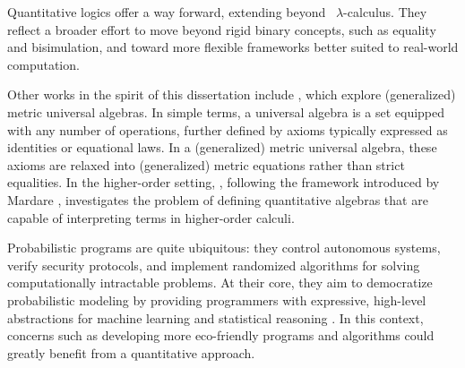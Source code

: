 Quantitative logics offer a way forward, extending beyond  $\lambda$-calculus. They reflect a broader effort to move beyond rigid binary concepts, such as equality and bisimulation, and toward more flexible frameworks better suited to real-world computation.

Other works in the spirit of this dissertation include \cite{mardare2016quantitative, mardare2017axiomatizability, mio24, jurka24}, which explore (generalized) metric universal algebras. In simple terms, a universal algebra is a set equipped with any number of operations, further defined by axioms typically expressed as identities or equational laws. In a (generalized) metric universal algebra, these axioms are relaxed into (generalized) metric equations rather than strict equalities. In the higher-order setting, \cite{lago22}, following the framework introduced by Mardare \cite{mardare2016quantitative}, investigates the problem of defining quantitative algebras that are capable of interpreting terms in higher-order calculi.


Probabilistic programs are quite ubiquitous: they control autonomous systems, verify security protocols, and implement randomized algorithms for solving computationally intractable problems. At their core, they aim to democratize probabilistic modeling by providing programmers with expressive, high-level abstractions for machine learning and statistical reasoning \cite{bartheFoundationsProbabilisticProgramming2020}. In this context, concerns such as developing more eco-friendly programs and algorithms could greatly benefit from a quantitative approach.







